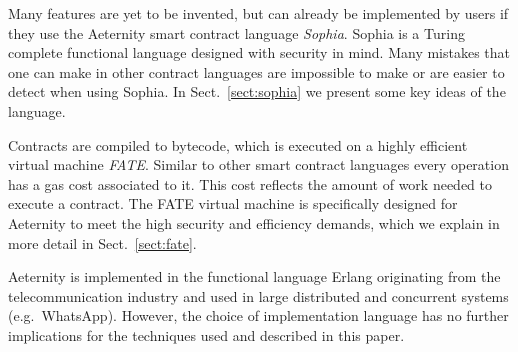 Many features are yet to be invented, but can already be implemented
by users if they use the Aeternity smart contract language
\textit{Sophia}. Sophia is a Turing complete functional language
designed with security in mind. Many mistakes that one can make in
other contract languages are impossible to make or are easier to detect
when using Sophia. In Sect.\ \ref{sect:sophia} we present some key
ideas of the language.

Contracts are compiled to bytecode, which is executed on a highly
efficient virtual machine \textit{FATE}. Similar to other smart contract
languages every operation has a gas cost associated to it. This cost reflects
the amount of work needed to execute a contract. The FATE virtual machine is specifically designed for
Aeternity to meet the high security and efficiency demands, which we
explain in more detail in Sect.~\ref{sect:fate}.

Aeternity is implemented in the functional language Erlang
\cite{Armstrong:2010:ERL:1810891.1810910} originating from the
telecommunication industry and used in large distributed and
concurrent systems (e.g.\ WhatsApp). However, the choice
of implementation language has no further
implications for the techniques used and described in this paper.
